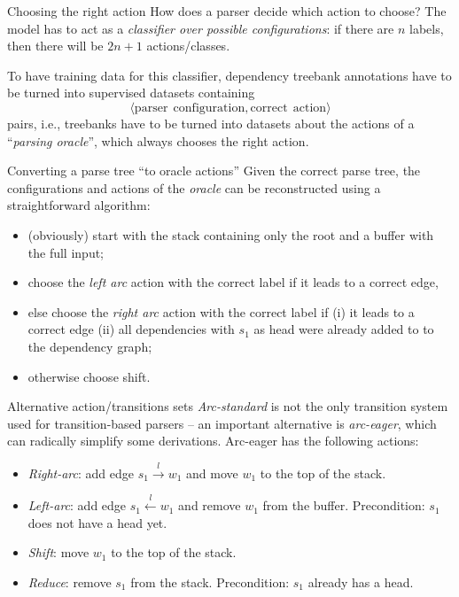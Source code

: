 \documentclass[style=upen, size=14pt]{powerdot}
\newcommand{\gold}{\color{arany}}
\theoremstyle{definition}
\begin{document}
\begin{slide}[toc=Decision]{Choosing the right action}
  How does a parser decide which action to choose? The model has to act as a
  \emph{\gold classifier over possible configurations}: if there are $n$ labels,
  then there will be $2n+1$ actions/classes.\bigskip
  
  To have training data for this classifier, dependency treebank annotations
  have to be turned into supervised datasets containing
  $$\langle \mathrm{parser~~configuration}, \mathrm{correct~~action} \rangle$$
  pairs, i.e., treebanks have to be turned into datasets about the actions of a
  ``\emph{\gold parsing oracle}'', which always chooses the right action.
\end{slide}

\begin{slide}[toc=Oracle actions]{Converting a parse tree ``to oracle actions''}
  Given the correct parse tree, the configurations and actions of the
  \emph{oracle} can be reconstructed using a straightforward algorithm:
  \begin{itemize}
  \item (obviously) start with the stack containing only the root and a buffer
    with the full input;
  \item choose the \emph{left arc} action with the correct label if it leads to a
    correct edge,
  \item else choose the \emph{right arc} action with the correct label if (i) it
    leads to a correct edge (ii) all dependencies with $s_1$ as head were already
    added to to the dependency graph;
  \item otherwise choose shift.
  \end{itemize}
\end{slide}

\begin{slide}[toc=Other actions]{Alternative action/transitions sets}
  \emph{Arc-standard} is not the only transition system used for
  transition-based parsers -- an important alternative is \emph{\gold
    arc-eager}, which can radically simplify some derivations. Arc-eager has the
  following actions:
  \begin{itemize}
  \item \emph{\gold Right-arc}: add edge $s_1\xrightarrow{l} w_1$ and move $w_1$
    to the top of the stack.
  \item \emph{\gold Left-arc}: add edge $s_1\xleftarrow{l} w_1$ and remove $w_1$
    from the buffer. Precondition: $s_1$ does not have a head yet.
  \item \emph{\gold Shift}: move $w_1$ to the top of the stack.
  \item \emph{\gold Reduce}: remove $s_1$ from the stack. Precondition: $s_1$
    already has a head.
  \end{itemize}
\end{slide}
\end{document}
